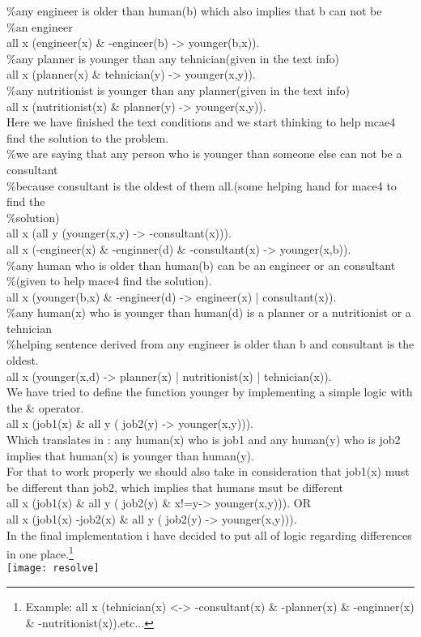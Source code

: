 \begin{itemize}
		\%any engineer is older than human(b) which also implies that b can not be \\
		\%an engineer \\
		all x (engineer(x) \& -engineer(b) -> younger(b,x)).\\
		\%any planner is younger than any tehnician(given in the text info)\\
		all x (planner(x) \& tehnician(y) -> younger(x,y)).\\
		\%any nutritionist is younger than any planner(given in the text info)\\
		all x (nutritionist(x) \& planner(y) -> younger(x,y)).\\
	\tab Here we have finished the text conditions and we start thinking to help mcae4 find the solution to the problem.\\
		\%we are saying that any person who is younger than someone else can not be a consultant\\
		\%because consultant is the oldest of them all.(some helping hand for mace4 to find the \\
		\%solution)\\
		all x (all y (younger(x,y) -> -consultant(x))).\\
		all x (-engineer(x) \& -enginner(d) \& -consultant(x) -> younger(x,b)).\\
		\%any human who is older than human(b) can be an engineer or an consultant\\
		\%(given to help mace4 find the solution).\\
		all x (younger(b,x) \& -engineer(d) -> engineer(x) | consultant(x)).\\
		\%any human(x) who is younger than human(d) is a planner or a nutritionist or a tehnician\\
		\%helping sentence derived from any engineer is older than b and consultant is the oldest.\\
		all x (younger(x,d) -> planner(x) | nutritionist(x) | tehnician(x)).\\

		\tab We have tried to define the function younger by implementing a simple logic with the \& operator.\\
		all x (job1(x) \& all y ( job2(y) -> younger(x,y))).\\
		\tab Which translates in : any human(x) who is job1 and any human(y) who is job2 implies that human(x) is younger than human(y).\\
		\tab For that to work properly we should also take in consideration that job1(x) must be different than job2, which implies that humans msut be different\\	
		all x (job1(x) \& all y ( job2(y) \& x!=y-> younger(x,y))). OR\\
		all x (job1(x) -job2(x) \& all y ( job2(y) -> younger(x,y))).\\
		\tab  In the final implementation i have decided to put all of logic regarding differences in one place.\footnote{Example: all x (tehnician(x) <-> -consultant(x) \& -planner(x) \& -enginner(x) \& -nutritionist(x)).etc...}\\
\texttt{[image: resolve]}\\


\end{itemize}
